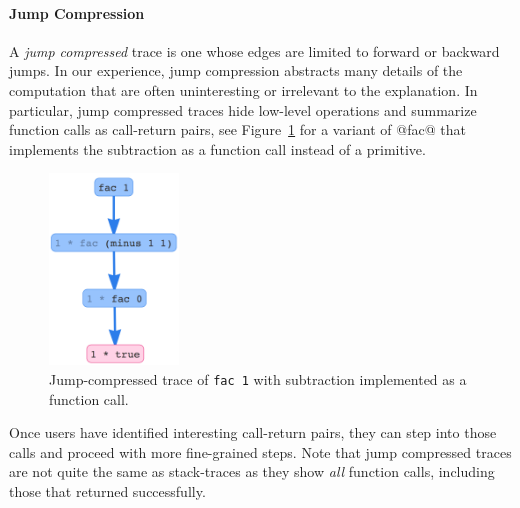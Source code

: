 \paragraph{Jump Compression}
%
A \emph{jump compressed} trace is one whose edges are limited to forward
or backward jumps.
%
In our experience, jump compression abstracts many details of the
computation that are often uninteresting or irrelevant to the
explanation.
%
In particular, jump compressed traces hide low-level operations and
summarize function calls as call-return pairs, see
Figure~\ref{fig:fac-jump} for a variant of @fac@ that implements the
subtraction as a function call instead of a primitive.
%
\begin{figure}[t]
\centering
\includegraphics[height=2in]{nanomaly/fac-minus.png}
\caption{Jump-compressed trace of \texttt{fac 1} with subtraction
  implemented as a function call.}
\label{fig:fac-jump}
\end{figure}
%
Once users have identified interesting call-return pairs, they can
step into those calls and proceed with more fine-grained steps.
%
%
Note that jump compressed traces are not quite the same as
stack-traces as they show \emph{all} function calls, including
those that returned successfully.
%



